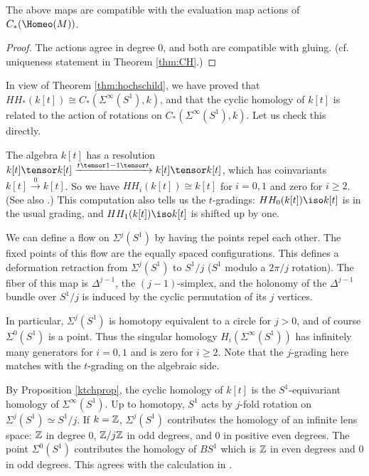 \begin{prop} \label{ktchprop}
The above maps are compatible with the evaluation map actions of $C_*(\Homeo(M))$.
\end{prop}

\begin{proof}
The actions agree in degree 0, and both are compatible with gluing.
(cf. uniqueness statement in Theorem \ref{thm:CH}.)
\end{proof}

\medskip

In view of Theorem \ref{thm:hochschild}, we have proved that $HH_*(k[t]) \cong C_*(\Sigma^\infty(S^1), k)$,
and that the cyclic homology of $k[t]$ is related to the action of rotations
on $C_*(\Sigma^\infty(S^1), k)$.
Let us check this directly.

The algebra $k[t]$ has a resolution 
$k[t] \tensor k[t] \xrightarrow{t\tensor 1 - 1 \tensor t} k[t] \tensor k[t]$, 
which has coinvariants $k[t] \xrightarrow{0} k[t]$. 
So we have $HH_i(k[t]) \cong k[t]$ for $i=0,1$ and zero for $i\ge 2$.
(See also  \cite[3.2.2]{MR1600246}.) This computation also tells us the $t$-gradings: 
$HH_0(k[t]) \iso k[t]$ is in the usual grading, and $HH_1(k[t]) \iso k[t]$ is shifted up by one.

We can define a flow on $\Sigma^j(S^1)$ by having the points repel each other.
The fixed points of this flow are the equally spaced configurations.
This defines a deformation retraction from $\Sigma^j(S^1)$ to $S^1/j$ ($S^1$ modulo a $2\pi/j$ rotation).
The fiber of this map is $\Delta^{j-1}$, the $(j-1)$-simplex, 
and the holonomy of the $\Delta^{j-1}$ bundle
over $S^1/j$ is induced by the cyclic permutation of its $j$ vertices.

In particular, $\Sigma^j(S^1)$ is homotopy equivalent to a circle for $j>0$, and
of course $\Sigma^0(S^1)$ is a point.
Thus the singular homology $H_i(\Sigma^\infty(S^1))$ has infinitely many generators for $i=0,1$
and is zero for $i\ge 2$.
Note that the $j$-grading here matches with the $t$-grading on the algebraic side.

By Proposition \ref{ktchprop}, 
the cyclic homology of $k[t]$ is the $S^1$-equivariant homology of $\Sigma^\infty(S^1)$.
Up to homotopy, $S^1$ acts by $j$-fold rotation on $\Sigma^j(S^1) \simeq S^1/j$.
If $k = \mathbb{Z}$, $\Sigma^j(S^1)$ contributes the homology of an infinite lens space: $\mathbb{Z}$ in degree
0, $\mathbb{Z}/j \mathbb{Z}$ in odd degrees, and 0 in positive even degrees.
The point $\Sigma^0(S^1)$ contributes the homology of $BS^1$ which is $\mathbb{Z}$ in even 
degrees and 0 in odd degrees.
This agrees with the calculation in \cite[\S 3.1.7]{MR1600246}.

